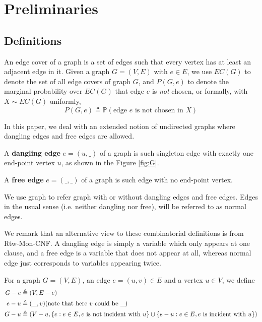 
\section{Preliminaries}
\subsection{Definitions}
An edge cover of a graph is a set of edges such that every vertex has at least an adjacent edge in it.
Given a graph $G=(V,E)$ with $e \in E$,  we use $EC(G)$ to denote the set of all edge covers of graph $G$, and $P(G, e)$ to denote the marginal probability over $EC(G)$ that edge $e$ is \emph{not} chosen, or formally, with $X \sim EC(G)$ uniformly,
\begin{equation}
	P(G, e) \triangleq \mathbb{P} \left(\textrm{edge $e$ is not chosen in $X$} \right)
	\label{defpge}
\end{equation}

In this paper, we deal with an extended notion of undirected graphs where dangling edges and free edges are allowed.
\begin{Def}
	A {\bf dangling edge} $e=(u,\_)$ of a graph is such singleton edge with exactly one end-point vertex $u$, as shown in the Figure \ref{fig:G}.

	A {\bf free edge} $e=(\_, \_)$ of a graph is such edge with no end-point vertex. %


\end{Def}

	We use graph to refer graph with or without dangling edges and free edges.
	Edges in the usual sense (i.e. neither dangling nor free), will be referred to as normal edges.

	We remark that an alternative view to these combinatorial definitions is from Rtw-Mon-CNF.
	A dangling edge is simply a variable which only appears at one clause, and a free edge is a variable
	that does not appear at all, whereas normal edge just corresponds to variables appearing twice.

For a graph $G=(V,E)$, an edge $e = (u,v) \in E$ and a vertex $u \in V$,
we define
\begin{align*}
G - e &\triangleq (V, E-e) \\
e - u &\triangleq (\_, v) \text{(note that here $v$ could be $\_$)} \\
G - u &\triangleq (V - u, \left\{e: e \in E, e\text{ is not incident with }u\right\} \cup \left\{e - u: e \in E, e\text{ is incident with }u\right\})
\end{align*}

